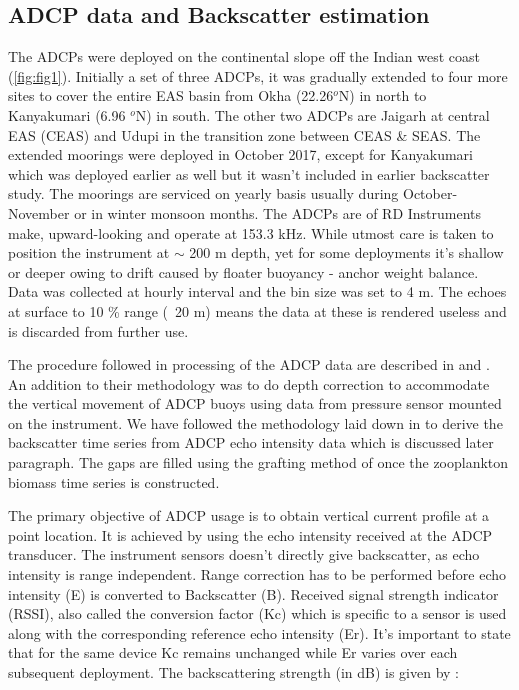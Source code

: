 \documentclass{article}
\begin{document}
	\subsection{ADCP data and Backscatter estimation}
	The ADCPs were deployed on the continental slope off the Indian west coast (\cref{fig:fig1}). Initially a set of three ADCPs, it was gradually extended to four more sites to cover the entire EAS basin from Okha (22.26$^o$N) in north to Kanyakumari (6.96 $^o$N) in south. The other two ADCPs are  Jaigarh at central EAS (CEAS) and Udupi in the transition zone between CEAS \& SEAS. The extended moorings were deployed in October 2017, except for Kanyakumari which was deployed earlier as well but it wasn't included in earlier backscatter study. The moorings are serviced on yearly basis usually during October-November or in winter monsoon months. The ADCPs are of RD Instruments make, upward-looking and operate at 153.3 kHz. While utmost care is taken to position the instrument at  $\sim$ 200 m depth, yet for some deployments it's shallow or deeper owing to drift caused by floater buoyancy - anchor weight balance. Data was collected at hourly interval and the bin size was set to 4 m. The echoes at surface to 10 \% range (~20 m) means the data at these is rendered useless and is discarded from further use. 
	
	The procedure followed in processing of the ADCP data are described in \citep{amol2014observed} and \citep{mukherjee2014observed}. An addition to their methodology was to do depth correction to accommodate the vertical movement of ADCP buoys \citep{chaudhuri2020observed, mukhopadhyay2020observed}
    using data from pressure sensor mounted on the instrument. We have followed the methodology laid down in \citep{aparna2022seasonal} to derive the backscatter time series from ADCP echo intensity data which is discussed later paragraph. The gaps are filled using the grafting method of \citep{mukhopadhyay2020observed} once the zooplankton biomass time series is constructed.
    
	The primary objective of ADCP usage is to obtain vertical current profile at a point location. It is achieved by using the echo intensity received at the ADCP transducer. The instrument sensors doesn't directly give backscatter, as echo intensity is range independent. Range correction has to be performed before echo intensity (E) is converted to Backscatter (B). Received signal strength indicator (RSSI), also called the conversion factor (Kc) which is specific to a sensor is used along with the corresponding reference echo intensity (Er). It's important to state that for the same device Kc remains unchanged while Er varies over each subsequent deployment. The backscattering strength (in dB) is given by \citep{mullison2017backscatter}:
	
\end{document}
